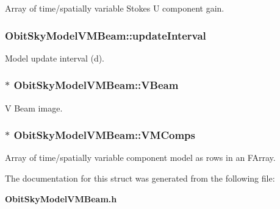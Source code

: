 Array of time/spatially variable Stokes U component gain. 

\subsubsection{ {\bf Obit\-Sky\-Model\-VMBeam::update\-Interval}}\label{structObitSkyModelVMBeam_o60}


Model update interval (d). 

\subsubsection{$\ast$ {\bf Obit\-Sky\-Model\-VMBeam::VBeam}}\label{structObitSkyModelVMBeam_o75}


V Beam image. 

\subsubsection{$\ast$ {\bf Obit\-Sky\-Model\-VMBeam::VMComps}}\label{structObitSkyModelVMBeam_o57}


Array of time/spatially variable component model as rows in an FArray. 



The documentation for this struct was generated from the following file:\begin{CompactItemize}
\item 
{\bf Obit\-Sky\-Model\-VMBeam.h}\end{CompactItemize}
